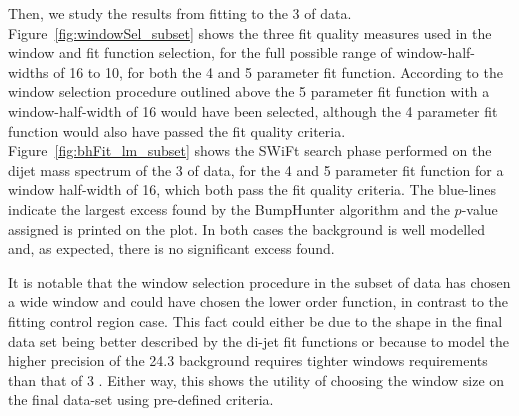 Then, we study the results from fitting to the 3 \ifb{}  of data.
Figure~\ref{fig:windowSel_subset} shows the three fit quality measures used in the window and fit function selection,
for the full possible range of window-half-widths of 16 to 10, for both the 4 and 5 parameter fit function.
According to the window selection procedure outlined above the 5 parameter fit function with a window-half-width of 16 would have been selected,
although the 4 parameter fit function would also have passed the fit quality criteria.
Figure~\ref{fig:bhFit_lm_subset} shows the SWiFt search phase performed on the dijet mass spectrum of the 3 \ifb{} of data,
for the 4 and 5 parameter fit function for a window half-width of 16, which both pass the fit quality criteria.
The blue-lines indicate the largest excess found by the {\sc BumpHunter} algorithm and the $p$-value assigned is printed on the plot. 
In both cases the background is well modelled and, as expected, there is no significant excess found.

It is notable that the window selection procedure in the subset of data has chosen a wide window and
could have chosen the lower order function, in contrast to the fitting control region case. 
This fact could either be due to the shape in the final data set being better described by the di-jet fit functions
or because to model the higher precision of the 24.3 \ifb{} background requires tighter windows requirements than that of 3 \ifb{}.
Either way, this shows the utility of choosing the window size on the final data-set using pre-defined criteria.

